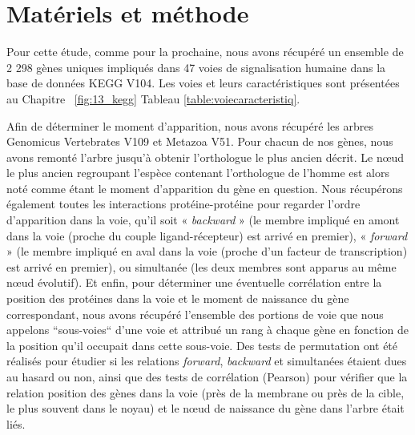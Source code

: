 \section{Matériels et méthode}
\par Pour cette étude, comme pour la prochaine, nous avons récupéré un ensemble de 2 298 gènes uniques impliqués dans 47 voies de signalisation humaine dans la base de données KEGG V104. Les voies et leurs caractéristiques sont présentées au Chapitre ~\ref{fig:13_kegg} Tableau \ref{table:voiecaracteristiq}. 
\par Afin de déterminer le moment d’apparition, nous avons récupéré les arbres Genomicus Vertebrates V109 et Metazoa V51. Pour chacun de nos gènes, nous avons remonté l’arbre jusqu’à obtenir l’orthologue le plus ancien décrit. Le nœud le plus ancien regroupant l’espèce contenant l’orthologue de l’homme est alors noté comme étant le moment d’apparition du gène en question. Nous récupérons également toutes les interactions protéine-protéine pour regarder l’ordre d’apparition dans la voie, qu’il soit « \textit{backward} » (le membre impliqué en amont dans la voie (proche du couple ligand-récepteur) est arrivé en premier), « \textit{forward} » (le membre impliqué en aval dans la voie (proche d’un facteur de transcription) est arrivé en premier), ou simultanée (les deux membres sont apparus au même nœud évolutif). Et enfin, pour déterminer une éventuelle corrélation entre la position des protéines dans la voie et le moment de naissance du gène correspondant, nous avons récupéré l’ensemble des portions de voie que nous appelons “sous-voies“ d’une voie et attribué un rang à chaque gène en fonction de la position qu’il occupait dans cette sous-voie. Des tests de permutation ont été réalisés pour étudier si les relations \textit{forward}, \textit{backward} et simultanées étaient dues au hasard ou non, ainsi que des tests de corrélation (Pearson) pour vérifier que la relation position des gènes dans la voie (près de la membrane ou près de la cible, le plus souvent dans le noyau) et le nœud de naissance du gène dans l’arbre était liés. 

